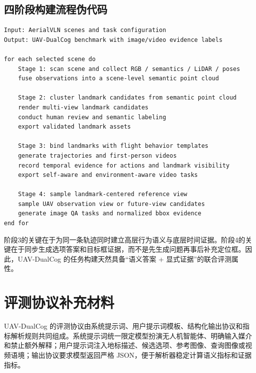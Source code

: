 \begin{thesisappendix}
\subsection{四阶段构建流程伪代码}

\begin{verbatim}
Input: AerialVLN scenes and task configuration
Output: UAV-DualCog benchmark with image/video evidence labels

for each selected scene do
    Stage 1: scan scene and collect RGB / semantics / LiDAR / poses
    fuse observations into a scene-level semantic point cloud

    Stage 2: cluster landmark candidates from semantic point cloud
    render multi-view landmark candidates
    conduct human review and semantic labeling
    export validated landmark assets

    Stage 3: bind landmarks with flight behavior templates
    generate trajectories and first-person videos
    record temporal evidence for actions and landmark visibility
    export self-aware and environment-aware video tasks

    Stage 4: sample landmark-centered reference view
    sample UAV observation view or future-view candidates
    generate image QA tasks and normalized bbox evidence
end for
\end{verbatim}

阶段3的关键在于为同一条轨迹同时建立高层行为语义与底层时间证据。阶段4的关键在于同步生成选项答案和目标框证据，而不是先生成问题再事后补充定位框。因此，UAV-DualCog 的任务构建天然具备“语义答案 + 显式证据”的联合评测属性。
\section{评测协议补充材料}
\label{app:evaluation-protocol}
\label{app:prompt-protocol}

UAV-DualCog 的评测协议由系统提示词、用户提示词模板、结构化输出协议和指标解析规则共同组成。系统提示词统一限定模型扮演无人机智能体、明确输入媒介和禁止额外解释；用户提示词注入地标描述、候选选项、参考图像、查询图像或视频语境；输出协议要求模型返回严格 JSON，便于解析器稳定计算语义指标和证据指标。


\end{thesisappendix}
